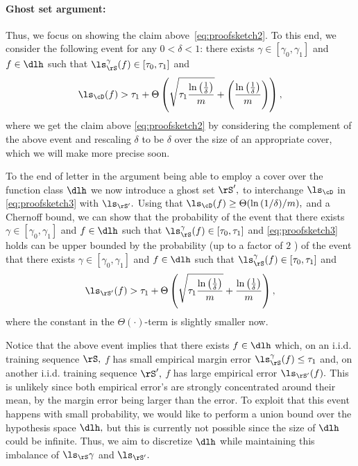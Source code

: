 \paragraph{Ghost set argument:}
Thus, we focus on showing the claim above~\cref{eq:proofsketch2}. To this end, we consider the following event for any $ 0<\delta<1 $: there exists $ \gamma\in\left[\gamma_{0},\gamma_{1}\right]$ and $ f\in \dlh $ such that $ \ls_{\rS}^{\gamma}(f)\in[\tau_{0},\tau_{1}] $ and   
\begin{align}\label{eq:proofsketch3}
  \ls_{\cD}(f)> \tau_{1}+\Theta\left(\sqrt{\tau_{1}\frac{\ln{\left(\frac{1}{\delta}\right)}}{m} }+\left(\frac{\ln{\left(\frac{1}{\delta}\right)}}{m} \right) \right),
 \end{align}
 where we get the claim above \cref{eq:proofsketch2} by considering the complement of the above event and rescaling $ \delta $ to be $ \delta $ over the size of an appropriate cover, which we will make more precise soon.

 To the end of letter in the argument being able to employ a cover over the function class $ \dlh $  we now introduce a ghost set $ \rS',$ to interchange $ \ls_{\cD} $ in \cref{eq:proofsketch3} with $ \ls_{\rS'}.$ Using that $ \ls_{\cD}(f)\geq \Theta(\ln{\left(1/\delta \right)}/m),$ and a Chernoff bound, we can show that the probability of the event that there exists $ \gamma\in\left[\gamma_{0},\gamma_{1}\right]$ and $ f\in \dlh $ such that $ \ls_{\rS}^{\gamma}(f)\in[\tau_{0},\tau_{1}] $ and \cref{eq:proofsketch3} holds can be upper bounded by the probability (up to a factor of $ 2 $ ) of the event that there exists $ \gamma\in\left[\gamma_{0},\gamma_{1}\right]$ and $ f\in \dlh $ such that $ \ls_{\rS}^{\gamma}(f)\in[\tau_{0},\tau_{1}] $   and
 \begin{align}\label{eq:proofsketch3}
  \ls_{\rS'}(f)> \tau_{1}+\Theta\left(\sqrt{\tau_{1}\frac{\ln{\left(\frac{1}{\delta}\right)}}{m} }+\frac{\ln{\left(\frac{1}{\delta}\right)}}{m} \right),
 \end{align}
 where the constant in the $ \Theta(\cdot) $-term is slightly smaller now. 

 Notice that the above event implies that there exists $ f\in \dlh $ which, on an i.i.d. training sequence $ \rS ,$ $ f $  has small empirical margin error $ \ls_{\rS}^{\gamma}(f)\leq \tau_{1} $ and, on another i.i.d. training sequence $ \rS',$ $ f $  has large empirical error $ \ls_{\rS'}(f).$ This is unlikely since both empirical error's are strongly concentrated around their mean, by the margin error being larger than the error. To exploit that this event happens with small probability, we would like to perform a union bound over the hypothesis space $ \dlh,$ but this is currently not possible since the size of $ \dlh $ could be infinite. Thus, we aim to discretize $ \dlh$ while maintaining this imbalance of $ \ls_{\rS}{\gamma} $ and $ \ls_{\rS'}. $   

